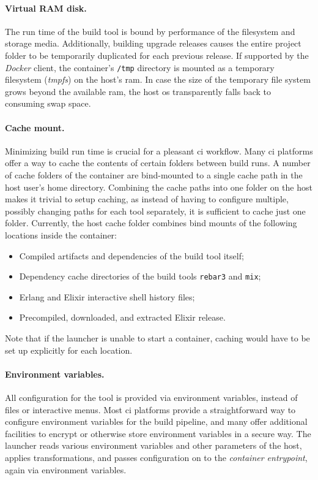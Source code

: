 \paragraph{Virtual RAM disk.} The run time of the build tool is bound by performance of the filesystem and storage media. Additionally, building upgrade releases causes the entire project folder to be temporarily duplicated for each previous release.
If supported by the \emph{Docker} client, the container's \lstinline|/tmp| directory is mounted as a temporary filesystem (\emph{tmpfs}) on the host's \acrshort{ram}. In case the size of the temporary file system grows beyond the available \acrshort{ram}, the host \acrshort{os} transparently falls back to consuming swap space.


\paragraph{Cache mount.} Minimizing build run time is crucial for a pleasant \acrlong{ci} workflow. Many \acrshort{ci} platforms offer a way to cache the contents of certain folders between build runs. A number of cache folders of the container are bind-mounted to a single cache path in the host user's home directory. Combining the cache paths into one folder on the host makes it trivial to setup caching, as instead of having to configure multiple, possibly changing paths for each tool separately, it is sufficient to cache just one folder. Currently, the host cache folder combines bind mounts of the following locations inside the container:
\begin{itemize}
  \item Compiled artifacts and dependencies of the build tool itself;
  \item Dependency cache directories of the build tools \lstinline|rebar3| and \lstinline|mix|;
  \item Erlang and Elixir interactive shell history files;
  \item Precompiled, downloaded, and extracted Elixir release.
\end{itemize}
Note that if the launcher is unable to start a container, caching would have to be set up explicitly for each location.

\paragraph{Environment variables.} All configuration for the tool is provided via environment variables, instead of files or interactive menus. Most \acrlong{ci} platforms provide a straightforward way to configure environment variables for the build pipeline, and many offer additional facilities to encrypt or otherwise store environment variables in a secure way. The launcher reads various environment variables and other parameters of the host, applies transformations, and passes configuration on to the \emph{container entrypoint}, again via environment variables.

